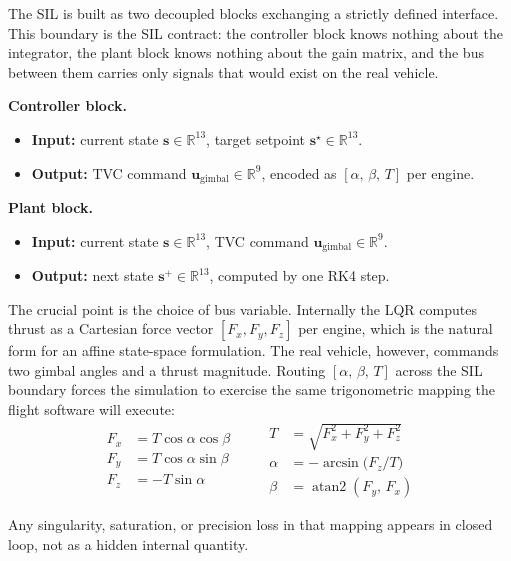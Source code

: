 \documentclass[11pt,a4paper]{article}
\begin{document}
The SIL is built as two decoupled blocks exchanging a strictly defined interface. This boundary is the SIL contract: the controller block knows nothing about the integrator, the plant block knows nothing about the gain matrix, and the bus between them carries only signals that would exist on the real vehicle.

\medskip
\noindent\textbf{Controller block.}
\begin{itemize}[leftmargin=*]
    \item \textbf{Input:} current state $\mathbf{s}\in\mathbb{R}^{13}$, target setpoint $\mathbf{s}^\star\in\mathbb{R}^{13}$.
    \item \textbf{Output:} TVC command $\mathbf{u}_{\text{gimbal}}\in\mathbb{R}^{9}$, encoded as $[\alpha,\,\beta,\,T]$ per engine.
\end{itemize}

\medskip
\noindent\textbf{Plant block.}
\begin{itemize}[leftmargin=*]
    \item \textbf{Input:} current state $\mathbf{s}\in\mathbb{R}^{13}$, TVC command $\mathbf{u}_{\text{gimbal}}\in\mathbb{R}^{9}$.
    \item \textbf{Output:} next state $\mathbf{s}^+\in\mathbb{R}^{13}$, computed by one RK4 step.
\end{itemize}

\medskip
The crucial point is the choice of bus variable. Internally the LQR computes thrust as a Cartesian force vector $[F_x, F_y, F_z]$ per engine, which is the natural form for an affine state-space formulation. The real vehicle, however, commands two gimbal angles and a thrust magnitude. Routing $[\alpha,\,\beta,\,T]$ across the SIL boundary forces the simulation to exercise the same trigonometric mapping the flight software will execute:
\[
\begin{aligned}
F_x &= T\cos\alpha\cos\beta \\
F_y &= T\cos\alpha\sin\beta \\
F_z &= -T\sin\alpha
\end{aligned}
\qquad
\begin{aligned}
T     &= \sqrt{F_x^2+F_y^2+F_z^2} \\
\alpha &= -\arcsin\!\bigl(F_z/T\bigr) \\
\beta  &= \operatorname{atan2}(F_y,\,F_x)
\end{aligned}
\]

Any singularity, saturation, or precision loss in that mapping appears in closed loop, not as a hidden internal quantity.
\end{document}
